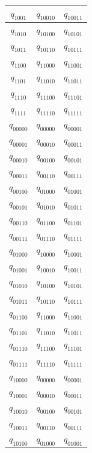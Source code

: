 \documentclass{article}
\begin{document}
\begin{longtable}{|c|c|c|}
      $q_{1001}$ & $q_{10010}$ & $q_{10011}$ \\ \hline
      $q_{1010}$ & $q_{10100}$ & $q_{10101}$ \\ \hline
      $q_{1011}$ & $q_{10110}$ & $q_{10111}$ \\ \hline
      $q_{1100}$ & $q_{11000}$ & $q_{11001}$ \\ \hline
      $q_{1101}$ & $q_{11010}$ & $q_{11011}$ \\ \hline
      $q_{1110}$ & $q_{11100}$ & $q_{11101}$ \\ \hline
      $q_{1111}$ & $q_{11110}$ & $q_{11111}$ \\ \hline
      $q_{00000}$ & $q_{00000}$ & $q_{00001}$ \\ \hline
      $q_{00001}$ & $q_{00010}$ & $q_{00011}$ \\ \hline
      $q_{00010}$ & $q_{00100}$ & $q_{00101}$ \\ \hline
      $q_{00011}$ & $q_{00110}$ & $q_{00111}$ \\ \hline
      $q_{00100}$ & $q_{01000}$ & $q_{01001}$ \\ \hline
      $q_{00101}$ & $q_{01010}$ & $q_{01011}$ \\ \hline
      $q_{00110}$ & $q_{01100}$ & $q_{01101}$ \\ \hline
      $q_{00111}$ & $q_{01110}$ & $q_{01111}$ \\ \hline
      $q_{01000}$ & $q_{10000}$ & $q_{10001}$ \\ \hline
      $q_{01001}$ & $q_{10010}$ & $q_{10011}$ \\ \hline
      $q_{01010}$ & $q_{10100}$ & $q_{10101}$ \\ \hline
      $q_{01011}$ & $q_{10110}$ & $q_{10111}$ \\ \hline
      $q_{01100}$ & $q_{11000}$ & $q_{11001}$ \\ \hline
      $q_{01101}$ & $q_{11010}$ & $q_{11011}$ \\ \hline
      $q_{01110}$ & $q_{11100}$ & $q_{11101}$ \\ \hline
      $q_{01111}$ & $q_{11110}$ & $q_{11111}$ \\ \hline
      $q_{10000}$ & $q_{00000}$ & $q_{00001}$ \\ \hline
      $q_{10001}$ & $q_{00010}$ & $q_{00011}$ \\ \hline
      $q_{10010}$ & $q_{00100}$ & $q_{00101}$ \\ \hline
      $q_{10011}$ & $q_{00110}$ & $q_{00111}$ \\ \hline
      $q_{10100}$ & $q_{01000}$ & $q_{01001}$ \\ \hline

\end{longtable}
\end{document}
